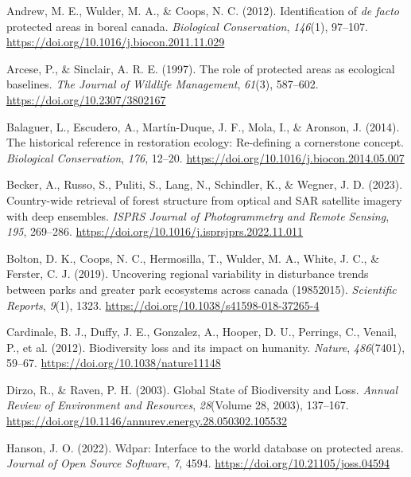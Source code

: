 \documentclass[
]{agujournal2019}
\newlength{\cslhangindent}
\newenvironment{CSLReferences}[2] %
 {\begin{list}{}{%
  \setlength{\itemindent}{0pt}
  \setlength{\leftmargin}{0pt}
  \setlength{\parsep}{0pt}
  \ifodd #1
   \setlength{\leftmargin}{\cslhangindent}
   \setlength{\itemindent}{-1\cslhangindent}
  \fi
  \setlength{\itemsep}{#2\baselineskip}}}
 {\end{list}}
\begin{document}
\label{refs}
\begin{CSLReferences}{1}{0}
\vspace{1em}

Andrew, M. E., Wulder, M. A., \& Coops, N. C. (2012). Identification of
{\emph{de facto}} protected areas in boreal canada. \emph{Biological
Conservation}, \emph{146}(1), 97--107.
\url{https://doi.org/10.1016/j.biocon.2011.11.029}

Arcese, P., \& Sinclair, A. R. E. (1997). The role of protected areas as
ecological baselines. \emph{The Journal of Wildlife Management},
\emph{61}(3), 587--602. \url{https://doi.org/10.2307/3802167}

Balaguer, L., Escudero, A., Martín-Duque, J. F., Mola, I., \& Aronson,
J. (2014). The historical reference in restoration ecology: Re-defining
a cornerstone concept. \emph{Biological Conservation}, \emph{176},
12--20. \url{https://doi.org/10.1016/j.biocon.2014.05.007}

Becker, A., Russo, S., Puliti, S., Lang, N., Schindler, K., \& Wegner,
J. D. (2023). Country-wide retrieval of forest structure from optical
and SAR satellite imagery with deep ensembles. \emph{ISPRS Journal of
Photogrammetry and Remote Sensing}, \emph{195}, 269--286.
\url{https://doi.org/10.1016/j.isprsjprs.2022.11.011}

Bolton, D. K., Coops, N. C., Hermosilla, T., Wulder, M. A., White, J.
C., \& Ferster, C. J. (2019). Uncovering regional variability in
disturbance trends between parks and greater park ecosystems across
canada (1985{\textendash}2015). \emph{Scientific Reports}, \emph{9}(1),
1323. \url{https://doi.org/10.1038/s41598-018-37265-4}

Cardinale, B. J., Duffy, J. E., Gonzalez, A., Hooper, D. U., Perrings,
C., Venail, P., et al. (2012). Biodiversity loss and its impact on
humanity. \emph{Nature}, \emph{486}(7401), 59--67.
\url{https://doi.org/10.1038/nature11148}

Dirzo, R., \& Raven, P. H. (2003). Global State of Biodiversity and
Loss. \emph{Annual Review of Environment and Resources},
\emph{28}(Volume 28, 2003), 137--167.
\url{https://doi.org/10.1146/annurev.energy.28.050302.105532}

Hanson, J. O. (2022). Wdpar: Interface to the world database on
protected areas. \emph{Journal of Open Source Software}, \emph{7}, 4594.
\url{https://doi.org/10.21105/joss.04594}


\end{CSLReferences}
\end{document}
